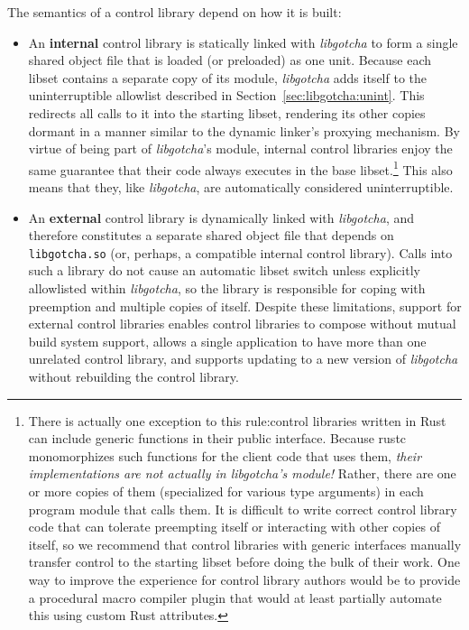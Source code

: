 The semantics of a control library depend on how it is built:
\begin{itemize}
\item An \textbf{internal} control library is statically linked with
	\textit{libgotcha} to form a single shared object file that is loaded (or
	preloaded) as one unit.  Because each libset contains a separate copy of
	its module, \textit{libgotcha} adds itself to the uninterruptible allowlist
	described in Section~\ref{sec:libgotcha:unint}.  This redirects all calls to
	it into the starting libset, rendering its other copies dormant in a manner
	similar to the dynamic linker's proxying mechanism.  By virtue of being part
	of \textit{libgotcha}'s module, internal control libraries enjoy the same
	guarantee that their code always executes in the base libset.\footnote{There
	is actually one exception to this rule:\@ control libraries written in Rust
	can include generic functions in their public interface.  Because rustc
	monomorphizes such functions for the client code that uses them,
	\textit{their implementations are not actually in \textrm{libgotcha}'s
	module!}  Rather, there are one or more copies of them (specialized for
	various type arguments) in each program module that calls them.  It is
	difficult to write correct control library code that can tolerate preempting
	itself or interacting with other copies of itself, so we recommend that
	control libraries with generic interfaces manually transfer control to the
	starting libset before doing the bulk of their work.  One way to improve the
	experience for control library authors would be to provide a procedural macro
	compiler plugin that would at least partially automate this using custom Rust
	attributes.}  This also means that
	they, like \textit{libgotcha}, are automatically considered uninterruptible.
\item An \textbf{external} control library is dynamically linked with
	\textit{libgotcha}, and therefore constitutes a separate shared object file
	that depends on \texttt{libgotcha.so} (or, perhaps, a compatible internal
	control library).  Calls into such a library do not cause an automatic libset
	switch unless explicitly allowlisted within \textit{libgotcha}, so the
	library is responsible for coping with preemption and multiple copies of
	itself.  Despite these limitations, support for external control libraries
	enables control libraries to compose without mutual build system support,
	allows a single application to have more than one unrelated control library,
	and supports updating to a new version of \textit{libgotcha} without
	rebuilding the control library.
\end{itemize}


